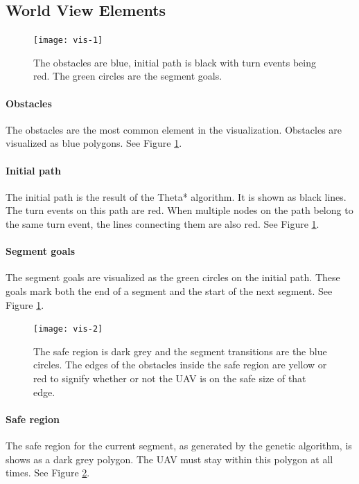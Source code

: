 \subsection{World View Elements}
\begin{figure}
	\centering
    \texttt{[image: vis-1]}
    \caption[Visualization of the obstacles, initial path, turn events and segment goals]{The obstacles are blue, initial path is black with turn events being red. The green circles are the segment goals.}
    \label{fig:vis-1}     
\end{figure}
\paragraph{Obstacles} The obstacles are the most common element in the visualization. Obstacles are visualized as blue polygons. See Figure \ref{fig:vis-1}.
\paragraph{Initial path} The initial path is the result of the Theta* algorithm. It is shown as black lines. The turn events on this path are red. When multiple nodes on the path belong to the same turn event, the lines connecting them are also red. See Figure \ref{fig:vis-1}.
\paragraph{Segment goals} The segment goals are visualized as the green circles on the initial path. These goals mark both the end of a segment and the start of the next segment. See Figure \ref{fig:vis-1}.

\clearpage
\begin{figure}[h]
	\centering
    \texttt{[image: vis-2]}
    \caption[Visualization of the safe region, obstacle edge constrain state and the segment transitions.]{The safe region is dark grey and the segment transitions are the blue circles. The edges of the obstacles inside the safe region are yellow or red to signify whether or not the UAV is on the safe size of that edge.}
    \label{fig:vis-2}     
\end{figure}

\paragraph{Safe region} The safe region for the current segment, as generated by the genetic algorithm, is shows as a dark grey polygon. The UAV must stay within this polygon at all times. See Figure \ref{fig:vis-2}.
